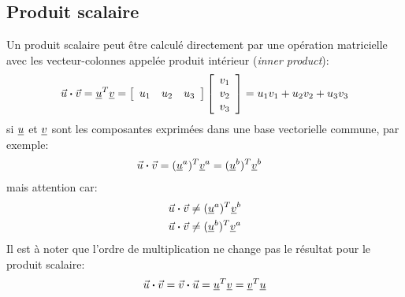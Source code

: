 \subsection{Produit scalaire}
Un produit scalaire peut être calculé directement par une opération matricielle avec les vecteur-colonnes appelée produit intérieur (\textit{inner product}):
\begin{equation}
\vec{u} \boldsymbol{\cdot} \vec{v} = \underline{u}^T \underline{v} = \left[ \begin{array}{c c c} u_1 & u_2 & u_3  \end{array} \right]  \left[ \begin{array}{c} v_1 \\ v_2 \\ v_3  \end{array} \right]
= u_1 v_1 + u_2 v_2 + u_3 v_3
\end{equation} 
si $\underline{u}$ et $\underline{v}$ sont les composantes exprimées dans une base vectorielle commune, par exemple:
\begin{align}
\vec{u} \boldsymbol{\cdot} \vec{v} &= (\underline{u}^a)^T \underline{v}^a = (\underline{u}^b)^T \underline{v}^b
\end{align} 
mais attention car: 
\begin{align}
\vec{u} \boldsymbol{\cdot} \vec{v} &\ne (\underline{u}^a)^T \underline{v}^b \\
\vec{u} \boldsymbol{\cdot} \vec{v} &\ne (\underline{u}^b)^T \underline{v}^a 
\end{align} 
Il est à noter que l'ordre de multiplication ne change pas le résultat pour le produit scalaire:
\begin{equation}
\vec{u} \boldsymbol{\cdot} \vec{v} = \vec{v} \boldsymbol{\cdot} \vec{u} = \underline{u}^T \underline{v} = \underline{v}^T \underline{u} 
\end{equation} 

